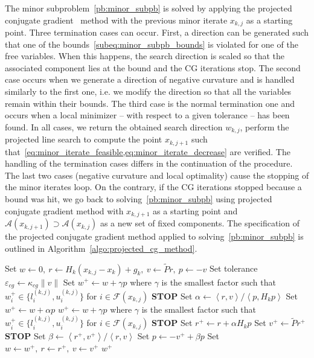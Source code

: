 \documentclass{article}
\numberwithin{equation}{section}
\newcommand{\calA}{{\mathcal{A}}}
\newcommand{\calF}{{\mathcal{F}}}
\newcommand{\inner}[2]{\left\langle {#1} , {#2} \right\rangle} %
\theoremstyle{plain}
\begin{document}
	The minor subproblem~\eqref{pb:minor_subpb} is solved by applying the projected conjugate gradient~\cite{gould-etal:2001} method with the previous minor iterate $x_{k,j}$ as a starting point. Three termination cases can occur. First, a direction can be generated such that one of the bounds~\eqref{subeq:minor_subpb_bounds} is violated for one of the free variables. When this happens, the search direction is scaled so that the associated component lies at the bound and the CG iterations stop. The second case occurs when we generate a direction of negative curvature and is handled similarly to the first one, i.e. we modify the direction so that all the variables remain within their bounds. The third case is the normal termination one and occurs when a local minimizer -- with respect to a given tolerance -- has been found. In all cases, we return the obtained search direction $w_{k,j}$, perform the projected line search to compute the point $x_{k,j+1}$ such that~\cref{eq:minor_iterate_feasible,eq:minor_iterate_decrease} are verified. The handling of the termination cases differs in the continuation of the procedure. The last two cases (negative curvature and local optimality) cause the stopping of the minor iterates loop. On the contrary, if the CG iterations stopped because a bound was hit, we go back to solving~\eqref{pb:minor_subpb} using projected conjugate gradient method with $x_{k,j+1}$ as a starting point and $\calA(x_{k,j+1}) \supset \calA(x_{k,j})$ as a new set of fixed components.
	The specification of the projected conjugate gradient method applied to solving~\eqref{pb:minor_subpb} is outlined in Algorithm~\ref{algo:projected_cg_method}.
	\begin{algorithm}
		\caption{The projected conjugate gradient method applied to~\eqref{pb:minor_subpb}}\label{algo:projected_cg_method}
		\begin{algorithmic}[1]
			\State\label{line:pcg_initial_projection}Set $w \gets 0,\ r \gets H_k(x_{k,j}-x_k)+g_k,\ v\gets \tilde{P}r,\ p \gets -v$
			\State Set tolerance $\varepsilon_{cg} \gets \kappa_{cg}\|v\|$
			\Repeat
			\If{$\inner{p}{H_kp}\le 0$}
			\State Set $w^+ \gets w + \gamma p$ where $\gamma$ is the smallest factor such that $w^+_i \in \{l^{(k,j)}_i,u^{(k,j)}_i\}$ 
			\State for $i \in \calF(x_{k,j})$
			\State \textbf{STOP}
			\EndIf
			\State Set $\alpha \gets \inner{r}{v} / \inner{p}{H_kp}$
			\State Set $w^+ \gets w+\alpha p$
			\State $w^+ \gets w + \gamma p$ where $\gamma$ is the smallest factor such that $w^+_i \in \{l^{(k,j)}_i,u^{(k,j)}_i\}$
			\State for $i \in \calF(x_{k,j})$
			\State \textbf{STOP}
			\EndIf
			\State Set $r^+ \gets r + \alpha H_kp$
			\State\label{line:pcg_iteration_projection} Set $v^+\gets \tilde{P}r^+$
			\If{$\sqrt{\inner{r^+}{v^+}} < \varepsilon_{cg}$} \textbf{STOP}
			\EndIf
			\State Set $\beta \gets \inner{r^+}{v^+} / \inner{r}{v}$ 
			\State Set $p \gets -v^+ + \beta p$
			\State Set $w\gets w^+,\ r \gets r^+,\ v \gets v^+$
			\Until{$2(n-m-|\calA(x_{k,j})|)$ iterations have been done} 
			\State{}
			\Return $w^+$
		\end{algorithmic}
	\end{algorithm} 
\end{document}

